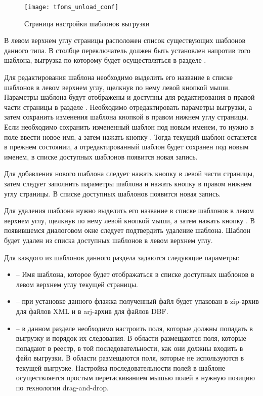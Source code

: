 \begin{figure}[ht]\centering
 \texttt{[image: tfoms\_unload\_conf]}
 \caption{Страница настройки шаблонов выгрузки}
 \label{img_tfoms_unload_conf}
\end{figure}

В левом верхнем углу страницы расположен список существующих шаблонов данного типа. В столбце  переключатель должен быть установлен напротив того шаблона, выгрузка по которому будет осуществляться в разделе .

Для редактирования шаблона необходимо выделить его название в списке шаблонов в левом верхнем углу, щелкнув по нему левой кнопкой мыши. Параметры шаблона будут отображены и доступны для редактирования в правой части страницы в разделе . Необходимо отредактировать параметры выгрузки, а затем сохранить изменения шаблона кнопкой  в правом нижнем углу страницы. Если необходимо сохранить измененный шаблон под новым именем, то нужно в поле  ввести новое имя, а затем нажать кнопку  . Тогда текущий шаблон останется в прежнем состоянии, а отредактированный шаблон будет сохранен под новым именем, в списке доступных шаблонов появится новая запись.

Для добавления нового шаблона следует нажать кнопку    в левой части страницы, затем следует заполнить параметры шаблона и нажать кнопку  в правом нижнем углу страницы. В списке доступных шаблонов появится новая запись.

Для удаления шаблона нужно выделить его название в списке шаблонов в левом верхнем углу, щелкнув по нему левой кнопкой мыши, а затем нажать кнопку  . В появившемся диалоговом окне следует подтвердить удаление шаблона. Шаблон будет удален из списка доступных шаблонов в левом верхнем углу.

Для каждого из шаблонов данного раздела задаются следующие параметры:
\begin{itemize}
 \item {} – Имя шаблона, которое будет отображаться в списке доступных шаблонов в левом верхнем углу текущей страницы.
 \item {} – при установке данного флажка полученный файл будет упакован в zip-архив для файлов XML и в arj-архив для файлов DBF.
 \item {} – в данном разделе необходимо настроить поля, которые должны попадать в выгрузку и порядок их следования. В области  размещаются поля, которые попадают в реестр, в той последовательности, как они должны входить в файл выгрузки. В области  размещаются поля, которые не используются в текущей выгрузке. Настройка последовательности полей в шаблоне осуществляется простым перетаскиванием мышью полей в нужную позицию по технологии drag-and-drop.
\end{itemize}

